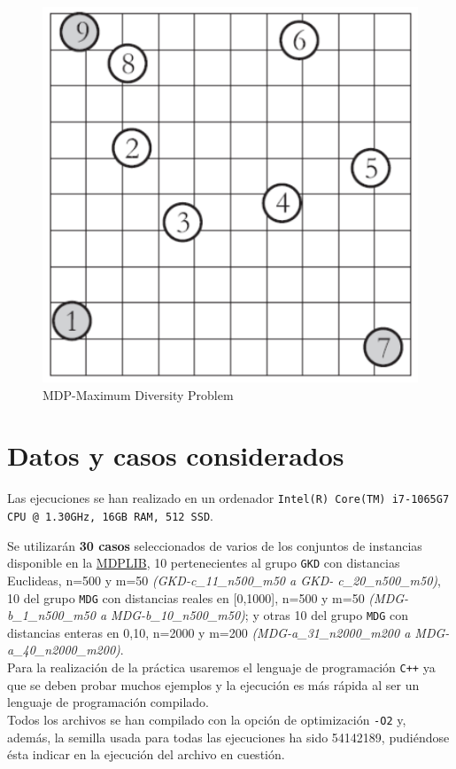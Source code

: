 \begin{figure}[H]
	\centering
	\includegraphics[scale=0.35]{img/mdp.png}
	\caption{MDP-Maximum Diversity Problem}
\end{figure}


\newpage
\section{Datos y casos considerados}
\hspace{1.5cm} Las ejecuciones se han realizado en un ordenador \texttt{Intel(R) Core(TM) i7-1065G7 CPU @ 1.30GHz, 16GB RAM, 512 SSD}. 


Se utilizarán \textbf{30 casos} seleccionados de varios de los conjuntos de instancias disponible en la \href{http://www.optsicom.es/mdp/}{MDPLIB}, 10 pertenecientes al grupo \texttt{GKD} con distancias Euclideas, n=500 y m=50 \textit{(GKD-c\_11\_n500\_m50 a GKD-
c\_20\_n500\_m50)}, 10 del grupo \texttt{MDG} con distancias reales en [0,1000], n=500 y m=50
\textit{(MDG-b\_1\_n500\_m50 a MDG-b\_10\_n500\_m50)}; y otras 10 del grupo \texttt{MDG} con distancias enteras en {0,10}, n=2000 y m=200 \textit{(MDG-a\_31\_n2000\_m200 a MDG-
a\_40\_n2000\_m200)}. \\


Para la realización de la práctica usaremos el lenguaje de programación \texttt{C++} ya que se deben probar muchos ejemplos y la ejecución es más rápida al ser un lenguaje de programación compilado. \\
Todos los archivos se han compilado con la opción de optimización \texttt{-O2} y, además,  la semilla usada para todas
las ejecuciones ha sido 54142189, pudiéndose ésta indicar en la ejecución del archivo en cuestión. 






